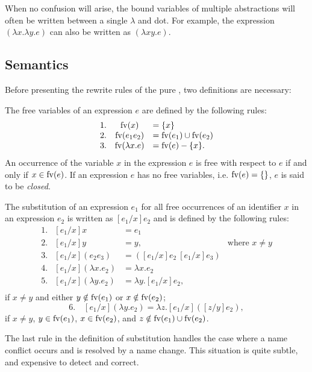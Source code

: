 When no confusion will arise, the bound variables of multiple abstractions will
often be written between a single \(\lambda\) and dot. For example, the
expression \((\lambda x.\lambda y.e)\) can also be written as
\((\lambda xy.e)\).

\subsection{Semantics}

Before presenting the rewrite rules of the pure \lambdacalculus, two
definitions are necessary:

\begin{definition}
The free variables of an expression \(e\) are defined by the following rules:
\[
\begin{array}{rcl}
1. & \operatorname{fv}(x) &= \{x\}\\
2. & \operatorname{fv}(e_1e_2) &= \operatorname{fv}(e_1) \cup \operatorname{fv}(e_2)\\
3. & \operatorname{fv}(\lambda x.e) &= \operatorname{fv}(e) - \{x\}.
\end{array}
\]
An occurrence of the variable \(x\) in the expression \(e\) is free with respect
to \(e\) if and only if \(x \in \operatorname{fv}(e)\). If an expression \(e\) has no free
variables, i.e. \(\operatorname{fv}(e)=\{\}\), \(e\) is said to be \emph{closed}.
\end{definition}

\begin{definition}[Substitution]
The substitution of an expression \(e_1\) for all free occurrences of an
identifier \(x\) in an expression \(e_2\) is written as \([e_1/x]e_2\) and is
defined by the following rules:
\[
\begin{array}{rcll}
1. & [e_1/x]x &= e_1\\
2. & [e_1/x]y &= y, & \text{where } x \ne y\\
3. & [e_1/x](e_2e_3) &= ([e_1/x]e_2\ [e_1/x]e_3)\\
4. & [e_1/x](\lambda x.e_2) &= \lambda x.e_2\\
5. & [e_1/x](\lambda y.e_2) &= \lambda y.[e_1/x]e_2,\\
\end{array}
\]
if \(x \ne y\) and either \(y \notin \operatorname{fv}(e_1)\) or \(x \notin \operatorname{fv}(e_2)\);
\[
6.\quad [e_1/x](\lambda y.e_2)=\lambda z.[e_1/x]([z/y]e_2),
\]
if \(x \ne y\), \(y \in \operatorname{fv}(e_1)\), \(x \in \operatorname{fv}(e_2)\), and
\(z \notin \operatorname{fv}(e_1) \cup \operatorname{fv}(e_2)\).
\end{definition}

The last rule in the definition of substitution handles the case where a name
conflict occurs and is resolved by a name change. This situation is quite
subtle, and expensive to detect and correct.

